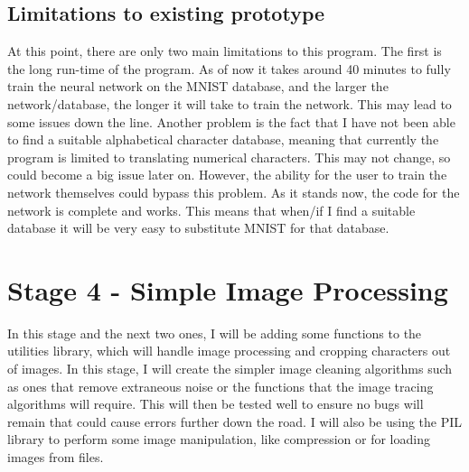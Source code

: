 \documentclass{report}
\begin{document}
\subsection{Limitations to existing prototype}
At this point, there are only two main limitations to this program. The first is the long run-time of the program. As of now it takes around 40 minutes to fully train the neural network on the MNIST database, and the larger the network/database, the longer it will take to train the network. This may lead to some issues down the line. Another problem is the fact that I have not been able to find a suitable alphabetical character database, meaning that currently the program is limited to translating numerical characters. This may not change, so could become a big issue later on. However, the ability for the user to train the network themselves could bypass this problem. As it stands now, the code for the network is complete and works. This means that when/if I find a suitable database it will be very easy to substitute MNIST for that database.
\newpage

\section{Stage 4 - Simple Image Processing}
In this stage and the next two ones, I will be adding some functions to the utilities library, which will handle image processing and cropping characters out of images. In this stage, I will create the simpler image cleaning algorithms such as ones that remove extraneous noise or the functions that the image tracing algorithms will require. This will then be tested well to ensure no bugs will remain that could cause errors further down the road. I will also be using the PIL library to perform some image manipulation, like compression or for loading images from files.
\end{document}
